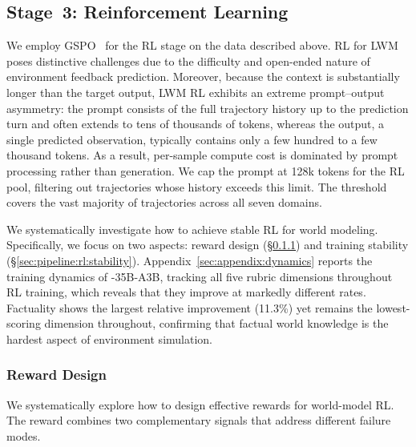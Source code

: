 \subsection{Stage~3: Reinforcement Learning}
\label{sec:pipeline:rl}

We employ GSPO~\citep{zheng2025group} for the RL stage on the data described above.
RL for LWM poses distinctive challenges due to the difficulty and open-ended nature of environment feedback prediction.
Moreover, because the context is substantially longer than the target output, LWM RL exhibits an extreme prompt--output asymmetry: the prompt consists of the full trajectory history up to the prediction turn and often extends to tens of thousands of tokens, whereas the output, a single predicted observation, typically contains only a few hundred to a few thousand tokens.
As a result, per-sample compute cost is dominated by prompt processing rather than generation.
We cap the prompt at 128k tokens for the RL pool, filtering out trajectories whose history exceeds this limit.
The threshold covers the vast majority of trajectories across all seven domains.

We systematically investigate how to achieve stable RL for world modeling. Specifically, we focus on two aspects: reward design (\S\ref{sec:pipeline:rl:reward}) and training stability (\S\ref{sec:pipeline:rl:stability}).
Appendix~\ref{sec:appendix:dynamics} reports the training dynamics of \method-35B-A3B, tracking all five rubric dimensions throughout RL training, which reveals that they improve at markedly different rates.
Factuality shows the largest relative improvement (11.3\%) yet remains the lowest-scoring dimension throughout, confirming that factual world knowledge is the hardest aspect of environment simulation.

\subsubsection{Reward Design}
\label{sec:pipeline:rl:reward}

We systematically explore how to design effective rewards for world-model RL. The reward combines two complementary signals that address different failure modes.

